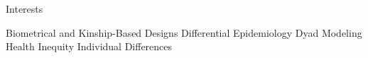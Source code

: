 \begin{rSection}{\textrm{Interests}} \begin{center}{\small Biometrical and Kinship-Based Designs \bigcdot Differential Epidemiology \bigcdot Dyad Modeling \bigcdot Health Inequity \bigcdot Individual Differences} \end{center}
\end{rSection}